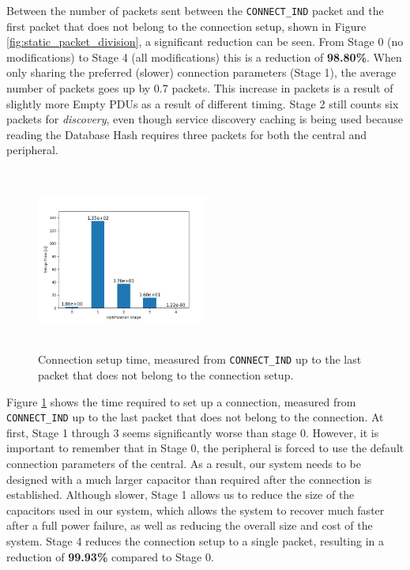 Between the number of packets sent between the \texttt{CONNECT\_IND} packet and the first packet that does not belong to the connection setup, shown in Figure \ref{fig:static_packet_division}, a significant reduction can be seen. From Stage 0 (no modifications) to Stage 4 (all modifications) this is a reduction of \textbf{98.80\%}. When only sharing the preferred (slower) connection parameters (Stage 1), the average number of packets goes up by 0.7 packets. This increase in packets is a result of slightly more Empty PDUs as a result of different timing. Stage 2 still counts six packets for \textit{discovery}, even though service discovery caching is being used because reading the Database Hash requires three packets for both the central and peripheral. 

\begin{figure}[]
    \centering
    \includegraphics[width=0.5\textwidth,height=6cm,keepaspectratio=true]{plots/static_setup_time.png}
    \caption{
        Connection setup time, measured from \texttt{CONNECT\_IND} up to the last packet that does not belong to the connection setup.
    }
    \label{fig:static_setup_time}
\end{figure}

Figure \ref{fig:static_setup_time} shows the time required to set up a connection, measured from \texttt{CONNECT\_IND} up to the last packet that does not belong to the connection. At first, Stage 1 through 3 seems significantly worse than stage 0. However, it is important to remember that in Stage 0, the peripheral is forced to use the default connection parameters of the central. As a result, our system needs to be designed with a much larger capacitor than required after the connection is established. Although slower, Stage 1 allows us to reduce the size of the capacitors used in our system, which allows the system to recover much faster after a full power failure, as well as reducing the overall size and cost of the system. Stage 4 reduces the connection setup to a single packet, resulting in a reduction of \textbf{99.93\%} compared to Stage 0.

